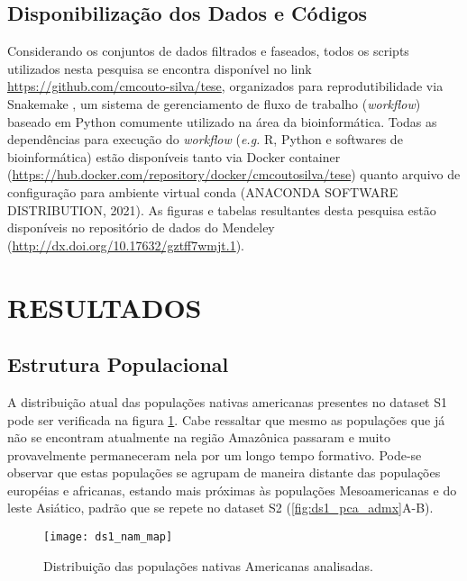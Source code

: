 \subsection{Disponibilização dos Dados e Códigos}

Considerando os conjuntos de dados filtrados e faseados, todos os scripts utilizados nesta pesquisa se encontra disponível no link \url{https://github.com/cmcouto-silva/tese}, organizados para reprodutibilidade via Snakemake \cite{koster_snakemake--scalable_2012}, um sistema de gerenciamento de fluxo de trabalho (\textit{workflow}) baseado em Python comumente utilizado na área da bioinformática. Todas as dependências para execução do \textit{workflow} (\emph{e.g.} R, Python e softwares de bioinformática) estão disponíveis tanto via Docker container (\url{https://hub.docker.com/repository/docker/cmcoutosilva/tese}) quanto arquivo de configuração para ambiente virtual conda (ANACONDA SOFTWARE DISTRIBUTION, 2021). As figuras e tabelas resultantes desta pesquisa estão disponíveis no repositório de dados do Mendeley (\url{http://dx.doi.org/10.17632/gztff7wmjt.1}).


\section{RESULTADOS}

\subsection{Estrutura Populacional}

A distribuição atual das populações nativas americanas presentes no dataset S1 pode ser verificada na figura \ref{fig:ds1_nam_map}. Cabe ressaltar que mesmo as populações que já não se encontram atualmente na região Amazônica passaram e muito provavelmente permaneceram nela por um longo tempo formativo. Pode-se observar que estas populações se agrupam de maneira distante das populações européias e africanas, estando mais próximas às populações Mesoamericanas e do leste Asiático, padrão que se repete no dataset S2 (\autoref{fig:ds1_pca_admx}A-B). 

\begin{figure}[!htbp]
\noindent
\centering
\texttt{[image: ds1\_nam\_map]}
\caption{Distribuição das populações nativas Americanas analisadas.}
\label{fig:ds1_nam_map}
\end{figure}

